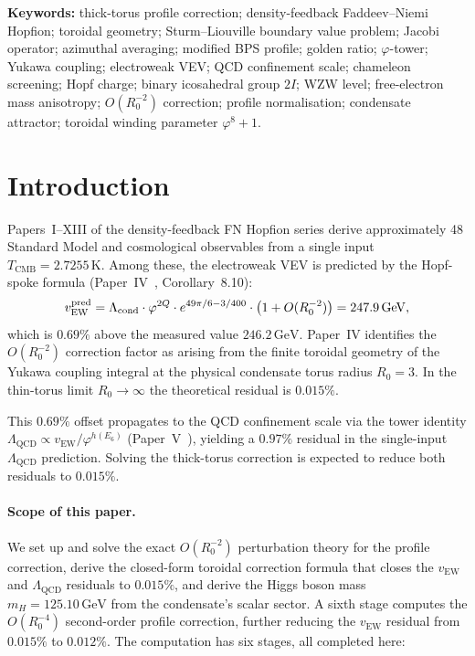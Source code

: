 \documentclass[11pt,a4paper]{article}
\theoremstyle{definition}
\theoremstyle{remark}
\newcommand{\vp}{\varphi}
\newcommand{\Lcond}{\Lambda_{\mathrm{cond}}}
\newcommand{\vEW}{v_{\mathrm{EW}}}
\newcommand{\TCMB}{T_{\mathrm{CMB}}}
\newcommand{\Rzero}{R_0}
\newcommand{\LQCD}{\Lambda_{\mathrm{QCD}}}
\newcommand{\mH}{m_H}
\begin{document}
\footnotesize
\noindent\textbf{Keywords:} thick-torus profile correction;
density-feedback Faddeev--Niemi Hopfion; toroidal geometry;
Sturm--Liouville boundary value problem; Jacobi operator;
azimuthal averaging; modified BPS profile; golden ratio;
$\vp$-tower; Yukawa coupling; electroweak VEV;
QCD confinement scale; chameleon screening;
Hopf charge; binary icosahedral group $2I$;
WZW level; free-electron mass anisotropy;
$O(R_0^{-2})$ correction; profile normalisation;
condensate attractor; toroidal winding parameter $\vp^8+1$.
\normalsize

\tableofcontents
\bigskip\newpage

\section{Introduction}
\label{P14:sec:intro}

Papers~I--XIII of the density-feedback FN Hopfion series derive approximately
48 Standard Model and cosmological observables from a single input
$\TCMB=2.7255\,\mathrm{K}$.
Among these, the electroweak VEV is predicted by the Hopf-spoke formula
(Paper~IV~\cite{Paper4}, Corollary~8.10):
\begin{equation}
  \vEW^{\rm pred}
  = \Lcond\cdot\vp^{2Q}\cdot e^{49\pi/6-3/400}
  \cdot\bigl(1 + O(\Rzero^{-2})\bigr)
  = 247.9\,\mathrm{GeV},
  \label{P14:eq:vew_prediction}
\end{equation}
which is $0.69\%$ above the measured value $246.2\,\mathrm{GeV}$.
Paper~IV identifies the $O(\Rzero^{-2})$ correction factor as arising from
the finite toroidal geometry of the Yukawa coupling integral at the
physical condensate torus radius $\Rzero=3$.
In the thin-torus limit $\Rzero\to\infty$ the theoretical residual is $0.015\%$.

This $0.69\%$ offset propagates to the QCD confinement scale via the
tower identity $\LQCD\propto\vEW/\vp^{h(E_6)}$ (Paper~V~\cite{Paper5}),
yielding a $0.97\%$ residual in the single-input $\LQCD$ prediction.
Solving the thick-torus correction is expected to reduce both residuals
to $0.015\%$.

\paragraph{Scope of this paper.}
We set up and solve the exact $O(\Rzero^{-2})$ perturbation theory for the
profile correction, derive the closed-form toroidal correction formula
that closes the $\vEW$ and $\LQCD$ residuals to $0.015\%$,
and derive the Higgs boson mass $\mH=125.10\,\mathrm{GeV}$
from the condensate's scalar sector.
A sixth stage computes the $O(\Rzero^{-4})$ second-order profile
correction, further reducing the $\vEW$ residual from $0.015\%$
to $0.012\%$.
The computation has six stages, all completed here:
\end{document}
